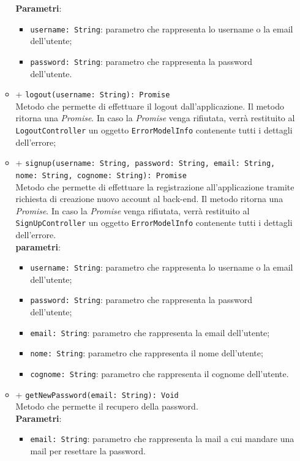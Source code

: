 \begin{itemize}
\begin{itemize}
			\textbf{Parametri}: 
			\begin{itemize}
				\item \texttt{username: String}: parametro che rappresenta lo username o la email dell'utente;
				\item \texttt{password: String}: parametro che rappresenta la password dell'utente.
			\end{itemize}
		\item + \texttt{logout(username: String): Promise} \\ Metodo che permette di effettuare il logout dall'applicazione. Il metodo ritorna una \textit{Promise}. In caso la \textit{Promise} venga rifiutata, verrà restituito al \texttt{LogoutController} un oggetto \texttt{ErrorModelInfo} contenente tutti i dettagli dell'errore; \\
		\item + \texttt{signup(username: String, password: String, email: String, nome: String, cognome: String): Promise} \\Metodo che permette di effettuare la registrazione all'applicazione tramite richiesta di creazione nuovo account al back-end. Il metodo ritorna una \textit{Promise}. In caso la \textit{Promise} venga rifiutata, verrà restituito al \texttt{SignUpController} un oggetto \texttt{ErrorModelInfo} contenente tutti i dettagli dell'errore. \\
			\textbf{parametri}:
			\begin{itemize}
				\item \texttt{username: String}: parametro che rappresenta lo username o la email dell'utente;
				\item \texttt{password: String}: parametro che rappresenta la password dell'utente;
				\item \texttt{email: String}: parametro che rappresenta la email dell'utente;
				\item \texttt{nome: String}: parametro che rappresenta il nome dell'utente;
				\item \texttt{cognome: String}: parametro che rappresenta il cognome dell'utente.
			\end{itemize}
		\item + \texttt{getNewPassword(email: String): Void}  \\Metodo che permette il recupero della password. \\
			\textbf{Parametri}:
			\begin{itemize}
				\item \texttt{email: String}: parametro che rappresenta la mail a cui mandare una mail per resettare la password.
			\end{itemize}
	\end{itemize}
\end{itemize}


